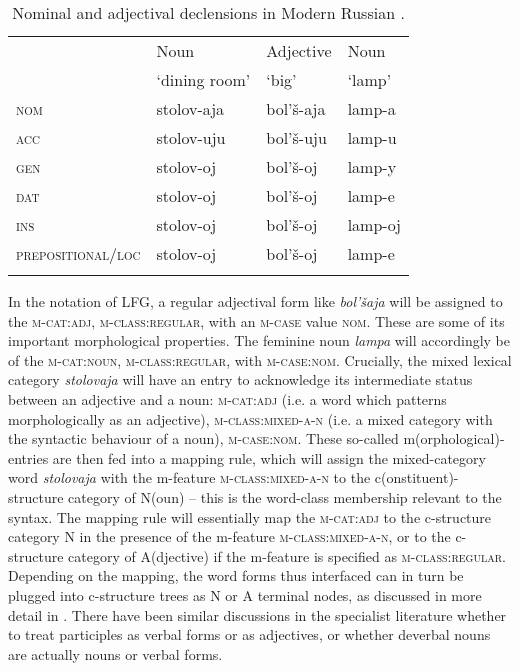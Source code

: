\documentclass[output=paper,hidelinks]{langscibook}
\begin{document}
\begin{table}
  \begin{tabularx}{\textwidth}{lXXl}\lsptoprule
 & Noun & Adjective & Noun\\
& `dining room' & `big' & `lamp'\\\midrule
\textsc{nom} & stolov-aja & bol'š-aja & lamp-a\\
\textsc{acc} & stolov-uju & bol'š-uju & lamp-u\\
\textsc{gen} & stolov-oj & bol'š-oj & lamp-y\\
\textsc{dat} & stolov-oj & bol'š-oj & lamp-e\\
\textsc{ins} & stolov-oj & bol'š-oj & lamp-oj\\
\mbox{\textsc{prepositional/loc}} & stolov-oj & bol'š-oj & lamp-e\\
\lspbottomrule
\end{tabularx}
\caption{Nominal and adjectival declensions in Modern Russian \citep[123]{spencer13}.}
\label{tab:Slavic:1}
\end{table}

In the notation of LFG, a regular adjectival form like \textit{bol'šaja} will be assigned to the \textsc{m-cat:adj}, \textsc{m-class:regular}, with an \textsc{m-case} value \textsc{nom}. These are some of its important morphological properties. The feminine noun \textit{lampa} will accordingly be of the \textsc{m-cat:noun,} \textsc{m-class:regular}, with \textsc{m-case:nom}. Crucially, the mixed lexical category \textit{stolovaja} will have an entry to acknowledge its intermediate status between an adjective and a noun: \textsc{m-cat:adj} (i.e. a word which patterns morphologically as an adjective), \textsc{m-class:mixed-a-n} (i.e. a mixed category with the syntactic behaviour of a noun), \textsc{m-case:nom}. These so-called m(orphological)-entries are then fed into a mapping rule, which will assign the mixed-category word \textit{stolovaja} with the m-feature \textsc{m-class:mixed-a-n} to the c(onstituent)-structure category of N(oun) -- this is the word-class membership relevant to the syntax. The mapping rule will essentially map the \textsc{m-cat:adj} to the c-structure category N in the presence of the m-feature \textsc{m-class:mixed-a-n,} or to the c-structure category of A(djective) if the m-feature is specified as \textsc{m-class:regular}. Depending on the mapping, the word forms thus interfaced can in turn be plugged into c-structure trees as N or A terminal nodes, as discussed in more detail in . There have been similar discussions in the specialist literature whether to treat participles as verbal forms or as adjectives, or whether deverbal nouns are actually nouns or verbal forms.
\end{document}
